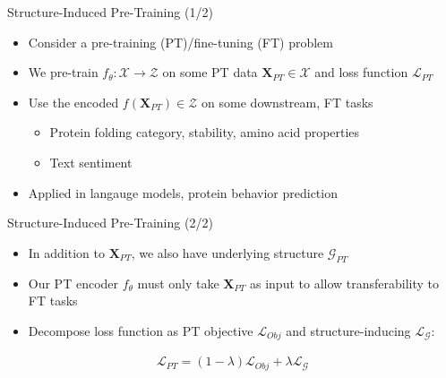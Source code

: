\documentclass{beamer}
\newcommand{\Graph}{\mathcal{G}}
\newcommand{\Loss}{\mathcal{L}}
\begin{document}
\begin{frame}{Structure-Induced Pre-Training (1/2)}
    \begin{itemize}
        \item Consider a pre-training (PT)/fine-tuning (FT) problem 
        \item We pre-train $f_\theta:\mathcal{X}\rightarrow\mathcal{Z}$ on some PT data $\mathbf{X}_{PT} \in \mathcal{X}$ and loss function $\Loss_{PT}$
        \item Use the encoded $f(\mathbf{X}_{PT}) \in \mathcal{Z}$ on some downstream, FT tasks 
        \begin{itemize}
            \item Protein folding category, stability, amino acid properties 
            \item Text sentiment 
        \end{itemize}
        \item Applied in langauge models, protein behavior prediction 
    \end{itemize}
\end{frame}

\begin{frame}{Structure-Induced Pre-Training (2/2)}
    \begin{itemize}
        \item In addition to $\mathbf{X}_{PT}$, we also have underlying structure $\Graph_{PT}$
        \item Our PT encoder $f_\theta$ must only take $\mathbf{X}_{PT}$ as input to allow transferability to FT tasks 
        \item Decompose loss function as PT objective $\Loss_{Obj}$ and structure-inducing $\Loss_\Graph$:
    \end{itemize}

    \begin{gather*}
        \Loss_{PT}
        =
        (1-\lambda)\Loss_{Obj}
        +
        \lambda \Loss_{\Graph}
    \end{gather*}
\end{frame}
\end{document}
